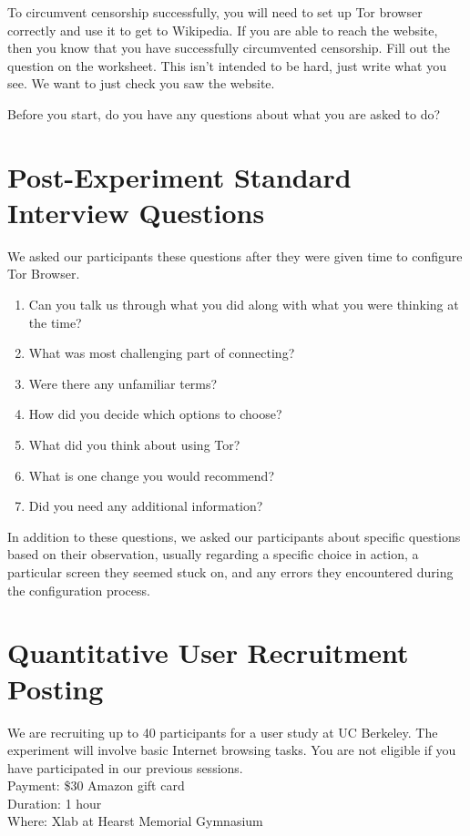 \documentclass{template}
\begin{document}
To circumvent censorship successfully, you will need to set up Tor browser correctly and use it to get to Wikipedia. If you are able to reach the website, then you know that you have successfully circumvented censorship. Fill out the question on the worksheet. This isn’t intended to be hard, just write what you see. We want to just check you saw the website. 

Before you start, do you have any questions about what you are asked to do? 

\section{Post-Experiment Standard Interview Questions}
We asked our participants these questions after they were given time to configure Tor Browser. 

\begin{enumerate} \itemsep1pt \parskip0pt  
\item{Can you talk us through what you did along with what you were thinking at the time?}
\item{What was most challenging part of connecting?}
\item{Were there any unfamiliar terms?}
\item{How did you decide which options to choose?}
\item{What did you think about using Tor?}
\item{What is one change you would recommend?} 
\item{Did you need any additional information?} 
\end{enumerate}  

In addition to these questions, we asked our participants about specific questions based on their observation, usually regarding a specific choice in action, a particular screen they seemed stuck on, and any errors they encountered during the configuration process. 

\section{Quantitative User Recruitment Posting}
\label{quantitative-recruitment}
We are recruiting up to 40 participants for a user study at UC Berkeley. The experiment will involve basic Internet browsing tasks. You are not eligible if you have participated in our previous sessions.\\

\indent Payment: \$30 Amazon gift card\\
\indent Duration: 1 hour \\
\indent Where: Xlab at Hearst Memorial Gymnasium\\
\end{document}
